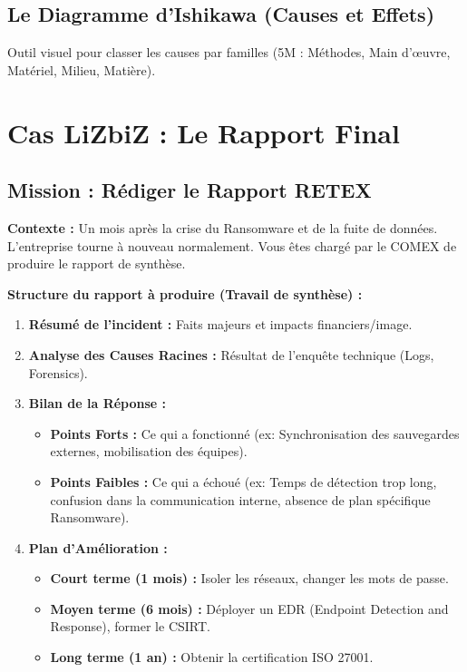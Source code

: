 \subsection{Le Diagramme d'Ishikawa (Causes et Effets)}

Outil visuel pour classer les causes par familles (5M : Méthodes, Main d'œuvre, Matériel, Milieu, Matière).

\section{Cas LiZbiZ : Le Rapport Final}

\subsection{Mission : Rédiger le Rapport RETEX}

\begin{boxlizbiz}
\textbf{Contexte :} Un mois après la crise du Ransomware et de la fuite de données. L'entreprise tourne à nouveau normalement. Vous êtes chargé par le COMEX de produire le rapport de synthèse.
\end{boxlizbiz}

\textbf{Structure du rapport à produire (Travail de synthèse) :}

\begin{enumerate}
    \item \textbf{Résumé de l'incident :} Faits majeurs et impacts financiers/image.
    \item \textbf{Analyse des Causes Racines :} Résultat de l'enquête technique (Logs, Forensics).
    \item \textbf{Bilan de la Réponse :}
    \begin{itemize}
        \item \textbf{Points Forts :} Ce qui a fonctionné (ex: Synchronisation des sauvegardes externes, mobilisation des équipes).
        \item \textbf{Points Faibles :} Ce qui a échoué (ex: Temps de détection trop long, confusion dans la communication interne, absence de plan spécifique Ransomware).
    \end{itemize}
    \item \textbf{Plan d'Amélioration :}
    \begin{itemize}
        \item \textbf{Court terme (1 mois) :} Isoler les réseaux, changer les mots de passe.
        \item \textbf{Moyen terme (6 mois) :} Déployer un EDR (Endpoint Detection and Response), former le CSIRT.
        \item \textbf{Long terme (1 an) :} Obtenir la certification ISO 27001.
    \end{itemize}
\end{enumerate}

